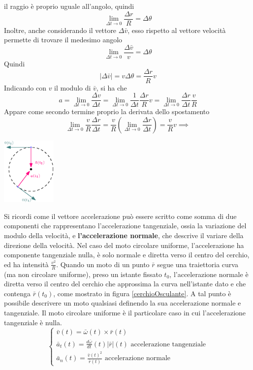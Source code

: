 \documentclass[10pt, letterpaper]{report}
\begin{document}
il raggio è proprio uguale all'angolo, quindi 
$$ \lim_{\Delta t \rightarrow 0}\frac{\Delta r}{R}=\Delta \theta $$
Inoltre, anche considerando il vettore $\Delta \bar v$, esso rispetto al vettore velocità 
permette di trovare il medesimo angolo 
$$ \lim_{\Delta t \rightarrow 0}\frac{\Delta \bar v}{v}=\Delta \theta $$
Quindi $$ |\Delta \bar v |= v\Delta \theta = \frac{\Delta r}{R}v$$
Indicando con $v$ il modulo di $\bar v$, si ha che 
$$ a=\lim_{\Delta t\rightarrow 0}\frac{\Delta v}{\Delta t}=
\lim_{\Delta t\rightarrow 0}  \frac{1}{\Delta t}\frac{\Delta r}{R}v=\lim_{\Delta t\rightarrow 0}  \frac{\Delta r}{\Delta t}\frac{v}{R}$$
Appare come secondo termine proprio la derivata dello spostamento 
$$\lim_{\Delta t\rightarrow 0} \frac{v}{R}\frac{\Delta r}{\Delta t}= 
\frac{v}{R}(\lim_{\Delta t\rightarrow 0}\frac{\Delta r}{\Delta t})=\frac{v}{R}v\implies  $$
\begin{center}
        \includegraphics[width=0.2\textwidth]{images/accelerazioneNormale.eps}
\end{center}
Si ricordi come il vettore accelerazione può essere scritto come somma di due componenti 
che rappresentano l'accelerazione tangenziale, ossia la variazione del modulo della velocità, e 
\textbf{l'accelerazione normale}, che descrive il variare della direzione della velocità. Nel 
caso del moto circolare uniforme, l'accelerazione ha componente tangenziale nulla, è solo 
normale e diretta verso il centro del cerchio, ed ha intensità $\frac{v^2}{R}$.\acc 
Quando un moto di un punto $\bar r$ segue una traiettoria curva (ma non circolare uniforme), preso un istante 
fissato $t_0$, l'accelerazione normale è diretta verso il centro del cerchio che approssima la curva 
nell'istante dato e che contenga $\bar r(t_0)$, come mostrato in figura \ref{cerchioOsculante}.
\acc 
A tal punto è possibile descrivere un moto qualsiasi definendo la sua accelerazione normale 
e tangenziale. Il moto circolare uniforme è il particolare caso in cui l'accelerazione 
tangenziale è nulla. $$ \begin{cases}
    \bar v(t) = \bar \omega(t) \times \bar r(t)   \\ 
    \bar a_t(t)  = \frac{d\bar \omega}{dt}(t)|\bar r|(t) \text{ accelerazione tangenziale} \\ 
    \bar a_n(t) = \frac{\bar v(t)^2}{\bar r(t)}\text{ accelerazione normale}
\end{cases}$$
\end{document}

